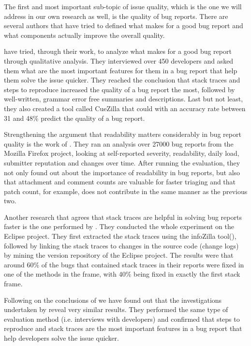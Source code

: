 \documentclass{mprop}
\begin{document}
The first and most important sub-topic of issue quality, which is the one
we will address in our own research as well, is the quality of bug reports.
There are several authors that have tried to defined what makes for a good bug
report and what components actually improve the overall quality.

\citet{bettenburg2008makes} have tried, through their work, to analyze what 
makes for a good bug report through qualitative analysis. They interviewed over
450 developers and asked them what are the most important features for them in
a bug report that help them solve the issue quicker. They reached the conclusion 
that stack traces and steps to reproduce increased the quality of a bug report 
the most, followed by well-written, grammar error free summaries and 
descriptions. Last but not least, they also created a tool called CueZilla that 
could with an accuracy rate between 31 and 48\% predict the quality of a bug 
report. 

Strengthening the argument that readability matters considerably in bug report 
quality is the work of \citet{hooimeijer2007modeling}. They ran an analysis over
27000 bug reports from the Mozilla Firefox project, looking at self-reported 
severity, readability, daily load, submitter reputation and changes over time. 
After running the evaluation, they not only found out about the importance of
readability in bug reports, but also that attachment and comment counts are 
valuable for faster triaging and that patch count, for example, does not
contribute in the same manner as the previous two.

Another research that agrees that stack traces are helpful in solving bug
reports faster is the one performed by \citet{schroter2010stack}. They conducted
the whole experiment on the Eclipse project. They first extracted the stack
traces using the infoZilla tool(\citep{bettenburg2008extracting}), followed by
linking the stack traces to changes in the source code (change logs) by mining
the version repository of the Eclipse project. The results were that 
around 60\% of the bugs that contained stack traces in their reports were fixed
in one of the methods in the frame, with 40\% being fixed in exactly the first
stack frame.

Following on the conclusions of \citet{bettenburg2008makes} we have found out
that the investigations undertaken by \citet{bettenburg2007quality} reveal 
very similar results. They performed the same type of evaluation method (i.e. 
interviews with developers) and confirmed that steps to reproduce and stack traces
are the most important features in a bug report that help developers solve the
issue quicker.
\end{document}

